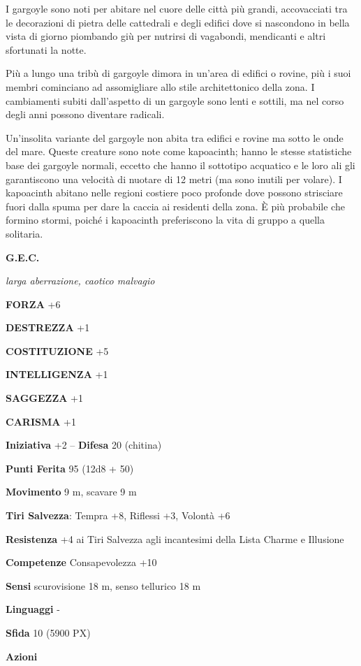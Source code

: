 \begin{multicols}{2}
I gargoyle sono noti per abitare nel cuore delle città più grandi, accovacciati tra le decorazioni di pietra delle cattedrali e degli edifici dove si nascondono in bella vista di giorno piombando giù per nutrirsi di vagabondi, mendicanti e altri sfortunati la notte.

Più a lungo una tribù di gargoyle dimora in un'area di edifici o rovine, più i suoi membri cominciano ad assomigliare allo stile architettonico della zona. I cambiamenti subiti dall'aspetto di un gargoyle sono lenti e sottili, ma nel corso degli anni possono diventare radicali.

Un'insolita variante del gargoyle non abita tra edifici e rovine ma sotto le onde del mare. Queste creature sono note come kapoacinth; hanno le stesse statistiche base dei gargoyle normali, eccetto che hanno il sottotipo acquatico e le loro ali gli garantiscono una velocità di nuotare di 12 metri (ma sono inutili per volare). I kapoacinth abitano nelle regioni costiere poco profonde dove possono strisciare fuori dalla spuma per dare la caccia ai residenti della zona. È più probabile che formino stormi, poiché i kapoacinth preferiscono la vita di gruppo a quella solitaria.

\medskip{}\textbf{G.E.C.}

\textit{larga aberrazione, caotico malvagio}

\textbf{FORZA} +6

\textbf{DESTREZZA} +1

\textbf{COSTITUZIONE} +5

\textbf{INTELLIGENZA} +1

\textbf{SAGGEZZA} +1

\textbf{CARISMA} +1

\textbf{Iniziativa} +2 -- \textbf{Difesa} 20 (chitina)

\textbf{Punti Ferita} 95 (12d8 + 50)

\textbf{Movimento} 9 m, scavare 9 m

\textbf{Tiri Salvezza}: Tempra +8, Riflessi +3, Volontà +6

\textbf{Resistenza} +4 ai Tiri Salvezza agli incantesimi della Lista Charme e Illusione

\textbf{Competenze} Consapevolezza +10

\textbf{Sensi} scurovisione 18 m, senso tellurico 18 m

\textbf{Linguaggi} -

\textbf{Sfida} 10 (5900 PX)

\textbf{Azioni}


\end{multicols}

